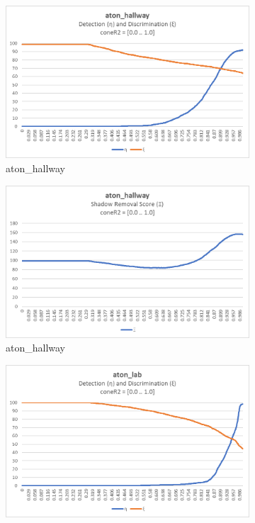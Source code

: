 \begin{appendices}
\begin{figure}
  \begin{subfigure}{.45\linewidth}
  \includegraphics[width=1\linewidth]{figures/appendix/hallway_coneR2_response.jpg}
  \caption{aton\_hallway}
\end{subfigure}
\hfill
\begin{subfigure}{.45\linewidth}
  \includegraphics[width=1\linewidth]{figures/appendix/hallway_coneR2_score.jpg}
  \caption{aton\_hallway}
\end{subfigure}
\hfill
\begin{subfigure}{.45\linewidth}
  \includegraphics[width=1\linewidth]{figures/appendix/lab_coneR2_response.jpg}

\end{subfigure}
\end{figure}
\end{appendices}
